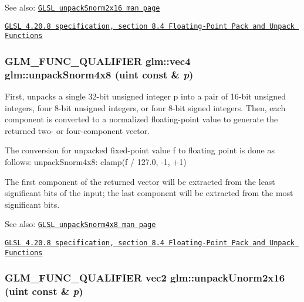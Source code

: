 \begin{Desc}
\item[See also:]\href{http://www.opengl.org/sdk/docs/manglsl/xhtml/unpackSnorm2x16.xml}{\tt GLSL unpackSnorm2x16 man page} 

\href{http://www.opengl.org/registry/doc/GLSLangSpec.4.20.8.pdf}{\tt GLSL 4.20.8 specification, section 8.4 Floating-Point Pack and Unpack Functions} \end{Desc}
\hypertarget{group__core__func__packing_g126a0deffef1f2d10dd67237981a870b}{
\subsubsection[unpackSnorm4x8]{\setlength{\rightskip}{0pt plus 5cm}GLM\_\-FUNC\_\-QUALIFIER {\bf glm::vec4} glm::unpackSnorm4x8 (uint const \& {\em p})}}
\label{group__core__func__packing_g126a0deffef1f2d10dd67237981a870b}


First, unpacks a single 32-bit unsigned integer p into a pair of 16-bit unsigned integers, four 8-bit unsigned integers, or four 8-bit signed integers. Then, each component is converted to a normalized floating-point value to generate the returned two- or four-component vector.

The conversion for unpacked fixed-point value f to floating point is done as follows: unpackSnorm4x8: clamp(f / 127.0, -1, +1)

The first component of the returned vector will be extracted from the least significant bits of the input; the last component will be extracted from the most significant bits.

\begin{Desc}
\item[See also:]\href{http://www.opengl.org/sdk/docs/manglsl/xhtml/unpackSnorm4x8.xml}{\tt GLSL unpackSnorm4x8 man page} 

\href{http://www.opengl.org/registry/doc/GLSLangSpec.4.20.8.pdf}{\tt GLSL 4.20.8 specification, section 8.4 Floating-Point Pack and Unpack Functions} \end{Desc}
\hypertarget{group__core__func__packing_gff327a2fca8abfe31b74b914b68ac5ec}{
\subsubsection[unpackUnorm2x16]{\setlength{\rightskip}{0pt plus 5cm}GLM\_\-FUNC\_\-QUALIFIER vec2 glm::unpackUnorm2x16 (uint const \& {\em p})}}
\label{group__core__func__packing_gff327a2fca8abfe31b74b914b68ac5ec}


